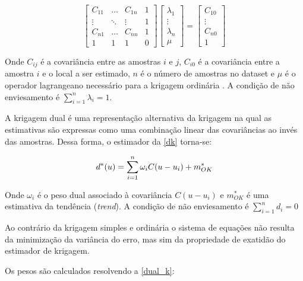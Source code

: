 \begin{equation}
    \label{global_k}
    \begin{bmatrix} 
    C_{11}&\dots&C_{1n}&1\\
    \vdots&\ddots&\vdots&1\\
    C_{n1}&\dots&C_{nn}&1\\ 
    1&1&1&0
    \end{bmatrix}
    \begin{bmatrix} 
    \lambda_{1}\\
    \vdots\\
    \lambda_{n}\\ 
    \mu
    \end{bmatrix}
    =
    \begin{bmatrix} 
    C_{10}\\
    \vdots\\
    C_{n0}\\ 
    1
    \end{bmatrix}
\end{equation}

Onde $C_{ij}$ é a covariância entre as amostras $i$ e $j$, $C_{i0}$ é a covariância entre a amostra $i$ e o local a ser estimado, $n$ é o número de amostras no dataset e $\mu$ é o operador lagrangeano necessário para a krigagem ordinária \cite{isaaks1989applied}. A condição de não enviesamento é $\sum_{i=1}^{n} \lambda_i=1$.

 \label{dksection}

A krigagem dual \cite{royer1984dual} é uma representação alternativa da krigagem na qual as estimativas são expressas como uma combinação linear das covariâncias ao invés das amostras. Dessa forma, o estimador da \autoref{dk} torna-se:

\begin{equation}
\label{dk}
d^*(u)=\sum_{i=1}^{n} \omega_i C(u-u_i) + m^*_{OK} \\
\end{equation}

Onde $\omega_i$ é o peso dual associado à covariância $C(u-u_i)$ e $m^*_{OK}$ é uma estimativa da tendência (\textit{trend}). A condição de não enviesamento é $\sum_{i=1}^{n} d_i=0$

Ao contrário da krigagem simples e ordinária o sistema de equações não resulta da minimização da variância do erro, mas sim da propriedade de exatidão do estimador de krigagem.

Os pesos são calculados resolvendo a \autoref{dual_k}:

